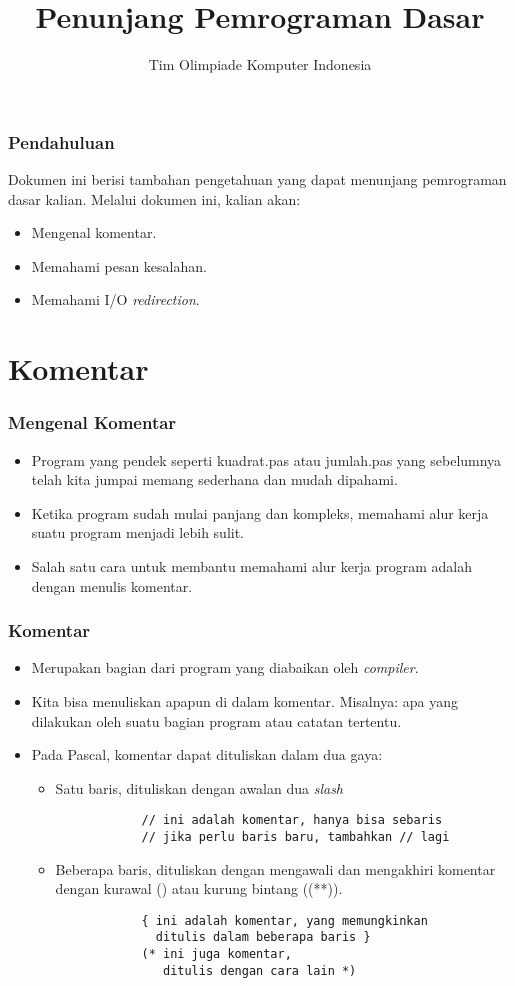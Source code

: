 \documentclass{beamer}
\title{Penunjang Pemrograman Dasar}
\author{Tim Olimpiade Komputer Indonesia}
\begin{document}
\begin{frame}
\titlepage
\end{frame}

\begin{frame}
\frametitle{Pendahuluan}
Dokumen ini berisi tambahan pengetahuan yang dapat menunjang pemrograman dasar kalian.
\vfill
Melalui dokumen ini, kalian akan:
\begin{itemize}
	\item Mengenal komentar.
	\item Memahami pesan kesalahan.
	\item Memahami I/O \textit{redirection}.
\end{itemize}
\end{frame}

\section{Komentar}
\frame{\sectionpage}

\begin{frame}
\frametitle{Mengenal Komentar}
\begin{itemize}
	\item Program yang pendek seperti kuadrat.pas atau jumlah.pas yang sebelumnya telah kita jumpai memang sederhana dan mudah dipahami.
	\item Ketika program sudah mulai panjang dan kompleks, memahami alur kerja suatu program menjadi lebih sulit.
	\item Salah satu cara untuk membantu memahami alur kerja program adalah dengan menulis komentar.
\end{itemize}
\end{frame}

\begin{frame}[fragile]
\frametitle{Komentar}
\begin{itemize}
	\item Merupakan bagian dari program yang diabaikan oleh \textit{compiler}.
	\item Kita bisa menuliskan apapun di dalam komentar. Misalnya: apa yang dilakukan oleh suatu bagian program atau catatan tertentu.
	\item Pada Pascal, komentar dapat dituliskan dalam dua gaya:
	\begin{itemize}
		\item Satu baris, dituliskan dengan awalan dua \textit{slash}
		\begin{lstlisting}
			// ini adalah komentar, hanya bisa sebaris
			// jika perlu baris baru, tambahkan // lagi
		\end{lstlisting}
		\item Beberapa baris, dituliskan dengan mengawali dan mengakhiri komentar dengan kurawal ({}) atau kurung bintang ((**)). 
		\begin{lstlisting}
			{ ini adalah komentar, yang memungkinkan 
			  ditulis dalam beberapa baris }
			(* ini juga komentar, 
			   ditulis dengan cara lain *)
		\end{lstlisting}
	\end{itemize}
\end{itemize}
\end{frame}
\end{document}
